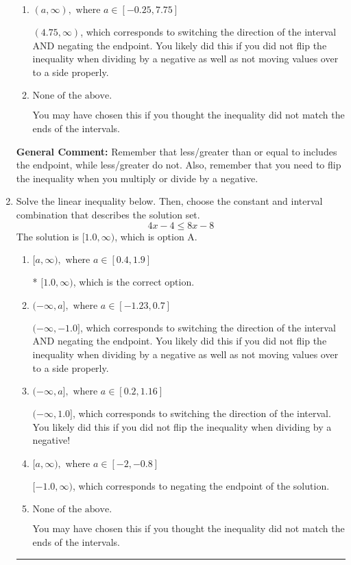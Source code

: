 \documentclass{extbook}[14pt]
\newcommand{\litem}[1]{\item #1

\rule{\textwidth}{0.4pt}}
\begin{document}
\begin{enumerate}
{\begin{enumerate}[label=\Alph*.]
 $(-\infty, 4.75)$, which corresponds to negating the endpoint of the solution.
\item \( (a, \infty), \text{ where } a \in [-0.25, 7.75] \)

 $(4.75, \infty)$, which corresponds to switching the direction of the interval AND negating the endpoint. You likely did this if you did not flip the inequality when dividing by a negative as well as not moving values over to a side properly.
\item \( \text{None of the above}. \)

You may have chosen this if you thought the inequality did not match the ends of the intervals.
\end{enumerate}

\textbf{General Comment:} Remember that less/greater than or equal to includes the endpoint, while less/greater do not. Also, remember that you need to flip the inequality when you multiply or divide by a negative.
}
\litem{
Solve the linear inequality below. Then, choose the constant and interval combination that describes the solution set.
\[ 4x -4 \leq 8x -8 \]
The solution is \( [1.0, \infty) \), which is option A.\begin{enumerate}[label=\Alph*.]
\item \( [a, \infty), \text{ where } a \in [0.4, 1.9] \)

* $[1.0, \infty)$, which is the correct option.
\item \( (-\infty, a], \text{ where } a \in [-1.23, 0.7] \)

 $(-\infty, -1.0]$, which corresponds to switching the direction of the interval AND negating the endpoint. You likely did this if you did not flip the inequality when dividing by a negative as well as not moving values over to a side properly.
\item \( (-\infty, a], \text{ where } a \in [0.2, 1.16] \)

 $(-\infty, 1.0]$, which corresponds to switching the direction of the interval. You likely did this if you did not flip the inequality when dividing by a negative!
\item \( [a, \infty), \text{ where } a \in [-2, -0.8] \)

 $[-1.0, \infty)$, which corresponds to negating the endpoint of the solution.
\item \( \text{None of the above}. \)

You may have chosen this if you thought the inequality did not match the ends of the intervals.
\end{enumerate}

}
\end{enumerate}
\end{document}
